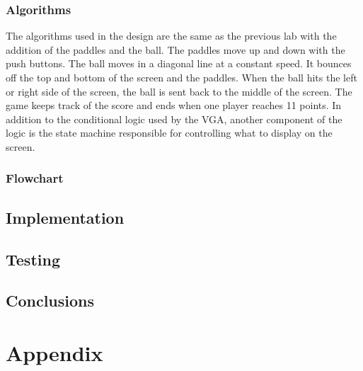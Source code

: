 \documentclass{article}
\begin{document}
\subsubsection*{Algorithms}
The algorithms used in the design are the same as the previous lab with the addition of the paddles and the ball. The paddles move up and down with the push buttons. The ball moves in a diagonal line at a constant speed. It bounces off the top and bottom of the screen and the paddles. When the ball hits the left or right side of the screen, the ball is sent back to the middle of the screen. The game keeps track of the score and ends when one player reaches 11 points. In addition to the conditional logic used by the VGA, another component of the logic is the state machine responsible for controlling what to display on the screen.

\subsubsection*{Flowchart}

\subsection*{Implementation}

\subsection*{Testing}

\subsection*{Conclusions}

\section*{Appendix}
\end{document}
